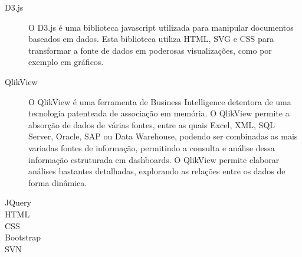 \begin{description}
  \item[D3.js] O D3.js é uma biblioteca javascript utilizada para manipular documentos baseados em dados. Esta biblioteca utiliza HTML, SVG e CSS para transformar a fonte de dados em poderosas visualizações, como por exemplo em gráficos.
  \item[QlikView] O QlikView é uma ferramenta de Business Intelligence detentora de uma tecnologia patenteada de associação em memória. O QlikView permite a absorção de dados de várias fontes, entre as quais Excel, XML, SQL Server, Oracle, SAP ou Data Warehouse, podendo ser combinadas as mais variadas fontes de informação, permitindo a consulta e análise dessa informação estruturada em dashboards. O QlikView permite elaborar análises bastantes detalhadas, explorando as relações entre os dados de forma dinâmica.
  \item[JQuery]
  \item[HTML]
  \item[CSS]
  \item[Bootstrap]
  \item[SVN]
  
\end{description}

